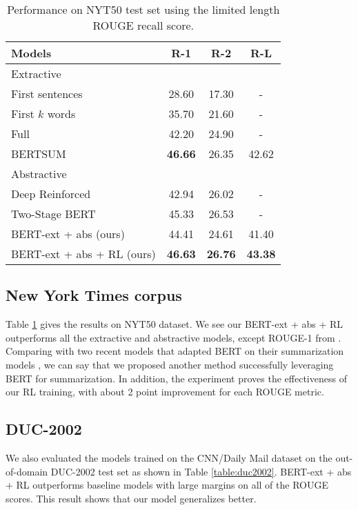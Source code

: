\documentclass[11pt,a4paper]{article}
\begin{document}
\begin{table}
\begin{center}
\begin{adjustbox}{max width=\columnwidth}
\begin{tabular}{l|ccc}
    \hline 
    \bf Models & \bf R-1 & \bf R-2 & \bf R-L \\ 
    \hline
    \multicolumn{4}{l}{Extractive} \\
    \hline
    First sentences \cite{durrett-etal-2016-learning} & 28.60 & 17.30 & - \\
    First $k$ words \cite{durrett-etal-2016-learning} & 35.70 & 21.60 & - \\
    Full \cite{durrett-etal-2016-learning} & 42.20 & 24.90 & - \\
    BERTSUM \cite{liu2019fine} & \bf 46.66 & 26.35 & 42.62 \\
    \hline
    \multicolumn{4}{l}{Abstractive} \\
    \hline
    Deep Reinforced \cite{paulus2018a} & 42.94 & 26.02 & - \\
    Two-Stage BERT \cite{zhang2019pretraining} & 45.33 & 26.53 & - \\
    BERT-ext + abs (ours) & 44.41 & 24.61 & 41.40 \\
    BERT-ext + abs + RL (ours) & \bf 46.63 & \bf 26.76 & \bf 43.38 \\
    \hline
\end{tabular}
\end{adjustbox}
\end{center}
\caption{\label{table:nyt50} Performance on NYT50 test set using the
limited length ROUGE recall score.}
\end{table}

\subsection{New York Times corpus}
Table \ref{table:nyt50} gives the results on NYT50 dataset.
We see our BERT-ext + abs + RL outperforms all the extractive
and abstractive models, except ROUGE-1 from \citet{liu2019fine}.
Comparing with two recent models that adapted BERT on their
summarization models \cite{liu2019fine, zhang2019pretraining},
we can say that we proposed another method successfully leveraging
BERT for summarization. In addition, the experiment proves
the effectiveness of our RL training, with about 2 point
improvement for each ROUGE metric.

\subsection{DUC-2002}
We also evaluated the models trained on the CNN/Daily Mail dataset
on the out-of-domain DUC-2002 test set as shown in Table \ref{table:duc2002}.
BERT-ext + abs + RL outperforms baseline models with large margins on
all of the ROUGE scores. This result shows that our model generalizes better.
\end{document}
